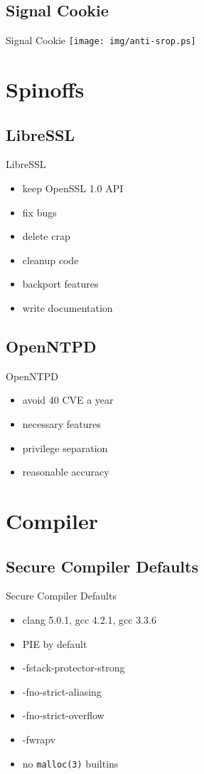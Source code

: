 \documentclass[14pt]{beamer}
\begin{document}
\subsection{Signal Cookie}
\begin{frame}{Signal Cookie}
\texttt{[image: img/anti-srop.ps]}
\end{frame}

\section{Spinoffs}

\subsection{LibreSSL}
\begin{frame}{LibreSSL}
\begin{itemize}
    \item keep OpenSSL 1.0 API
    \item fix bugs
    \item delete crap
    \item cleanup code
    \item backport features
    \item write documentation
\end{itemize}
\end{frame}

\subsection{OpenNTPD}
\begin{frame}{OpenNTPD}
\begin{itemize}
    \item avoid 40 CVE a year
    \item necessary features
    \item privilege separation
    \item reasonable accuracy
\end{itemize}
\end{frame}

\section{Compiler}

\subsection{Secure Compiler Defaults}
\begin{frame}{Secure Compiler Defaults}
\begin{itemize}
    \item clang 5.0.1, gcc 4.2.1, gcc 3.3.6
    \item PIE by default
    \item -fstack-protector-strong
    \item -fno-strict-aliasing
    \item -fno-strict-overflow
    \item -fwrapv
    \item no \texttt{malloc(3)} builtins
\end{itemize}
\end{frame}
\end{document}
